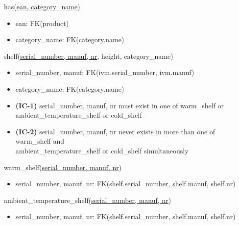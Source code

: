 \documentclass[12pt,a4paper]{article}
\begin{document}
  \vspace*{10pt}
  
  \noindent
  has(\underline{ean, category\_name})
  \begin{itemize}[nosep]
    \item ean: FK(product)
    \item category\_name: FK(category.name)
  \end{itemize}
  
  
  \vspace*{10pt}
  
  \noindent
  shelf(\underline{serial\_number, manuf, nr}, height, category\_name)
  \begin{itemize}[nosep]
    \item serial\_number, manuf: FK(ivm.serial\_number, ivm.manuf)
    \item category\_name: FK(category.name)
    \item \textsf{\textbf{(IC-1)}} serial\_number, manuf, nr \textsf{must exist in one of} warm\_shelf \textsf{or}\\ ambient\_temperature\_shelf \textsf{or} cold\_shelf
    \item \textsf{\textbf{(IC-2)}} serial\_number, manuf, nr \textsf{never exists in more than one of} warm\_shelf \textsf{and}\\ ambient\_temperature\_shelf \textsf{or} cold\_shelf \textsf{simultaneously}
  \end{itemize}
  
  \vspace*{10pt}
  
  \noindent
  warm\_shelf(\underline{serial\_number, manuf, nr})
  \begin{itemize}[nosep]
    \item serial\_number, manuf, nr: FK(shelf.serial\_number, shelf.manuf, shelf.nr)
  \end{itemize}
  
  \vspace*{10pt}
  
  \noindent
  ambient\_temperature\_shelf(\underline{serial\_number, manuf, nr})
  \begin{itemize}[nosep]
    \item serial\_number, manuf, nr: FK(shelf.serial\_number, shelf.manuf, shelf.nr)
  \end{itemize}
  
  \vspace*{10pt}
  
\end{document}
